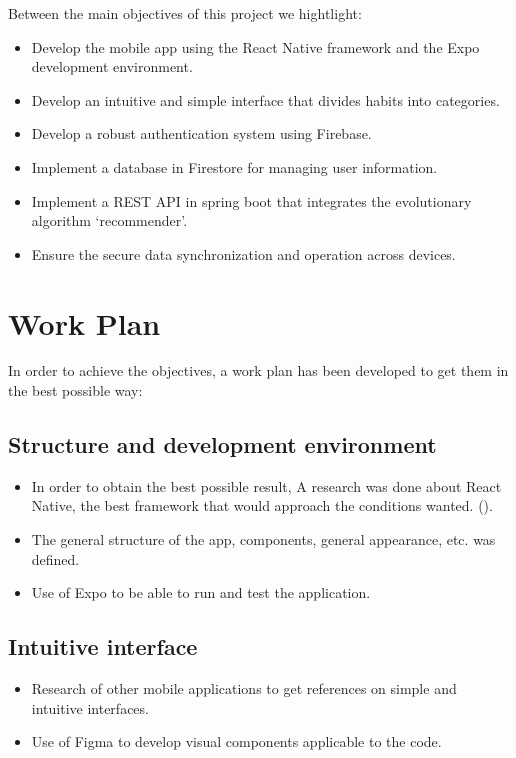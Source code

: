 Between the main objectives of this project we hightlight:
\begin{itemize}
    \item Develop the mobile app using the React Native framework and the Expo development environment.
    \item Develop an intuitive and simple interface that divides habits into categories.
    \item Develop a robust authentication system using Firebase.
    \item Implement a database in Firestore for managing user information.
    \item Implement a REST API in spring boot that integrates the evolutionary algorithm ‘recommender’.
    \item Ensure the secure data synchronization and operation across devices.
\end{itemize}

\section*{Work Plan}

In order to achieve the objectives, a work plan has been developed to get them in the best possible way:

\subsection*{Structure and development environment}

\begin{itemize}
    \item In order to obtain the best possible result, A research was done about React Native, the best framework that would approach the conditions wanted. (\cite{info_framework}).
    \item The general structure of the app, components, general appearance, etc. was defined.
    \item Use of Expo to be able to run and test the application.
\end{itemize}

\subsection*{Intuitive interface}
\begin{itemize}
    \item Research of other mobile applications to get references on simple and intuitive interfaces.
    \item Use of Figma to develop visual components applicable to the code.
\end{itemize}

